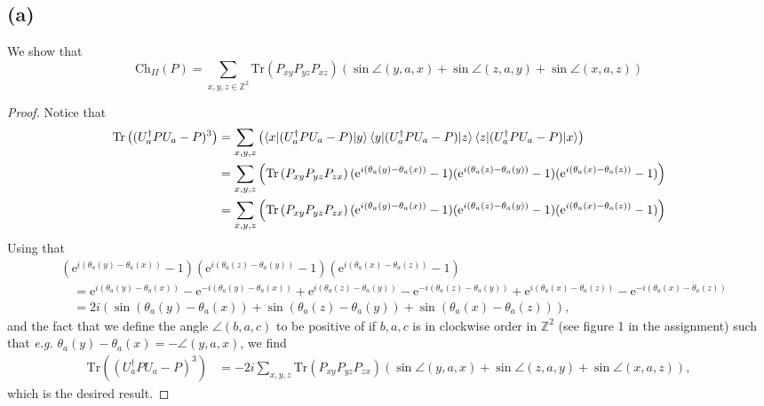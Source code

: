\documentclass[a4paper,11pt]{article}
\newcommand{\euler}[1]{\text{e}^{#1}}
\newcommand{\trace}[1]{\text{Tr}\left(#1\right)}
\newcommand{\eg}{\emph{e.g.} }
\newcommand{\Z}{\mathbb{Z}}
\numberwithin{equation}{section}
\begin{document}
\subsection*{(a)}
We show that \begin{equation}
\text{Ch}_{II}(P)=\sum_{x,y,z\in\Z^2}\trace{P_{xy}P_{yz}P_{xz}}\left(\sin\angle(y,a,x)+\sin\angle(z,a,y)+\sin\angle(x,a,z)\right)
\end{equation}
\begin{proof}
	Notice that \begin{equation}
	\begin{aligned}
	\trace{(U_a^\dagger PU_a-P)^3}&=\sum_{x,y,z}\left(\braket{x|(U_a^\dagger PU_a-P)|y}\braket{y|(U_a^\dagger PU_a-P)|z}\braket{z|(U_a^\dagger PU_a-P)|x}\right)\\
	&=\sum_{x,y,z}\left(\trace{P_{xy}P_{yz}P_{zx}}(\euler{i(\theta_a(y)-\theta_a(x))}-1)(\euler{i(\theta_a(z)-\theta_a(y))}-1)(\euler{i(\theta_a(x)-\theta_a(z))}-1)\right)\\
	&=\sum_{x,y,z}\left(\trace{P_{xy}P_{yz}P_{zx}}(\euler{i(\theta_a(y)-\theta_a(x))}-1)(\euler{i(\theta_a(z)-\theta_a(y))}-1)(\euler{i(\theta_a(x)-\theta_a(z))}-1)\right)
	\end{aligned}
	\end{equation}
	Using that
	\begin{equation}
	\begin{aligned}
	&(\euler{i(\theta_a(y)-\theta_a(x))}-1)(\euler{i(\theta_a(z)-\theta_a(y))}-1)(\euler{i(\theta_a(x)-\theta_a(z))}-1)\\&\quad=\euler{i(\theta_a(y)-\theta_a(x))}-\euler{-i(\theta_a(y)-\theta_a(x))}+\euler{i(\theta_a(z)-\theta_a(y))}-\euler{-i(\theta_a(z)-\theta_a(y))}+\euler{i(\theta_a(x)-\theta_a(z))}-\euler{-i(\theta_a(x)-\theta_a(z))}\\&\quad= 2i\left(\sin(\theta_a(y)-\theta_a(x))+\sin(\theta_a(z)-\theta_a(y))+\sin(\theta_a(x)-\theta_a(z))\right),
	\end{aligned}
	\end{equation}
	and the fact that we define the angle $ \angle(b,a,c) $ to be positive of if $ b,a,c $ is in clockwise order in $ \Z^2 $ (see figure 1 in the assignment) such that \eg $ \theta_a(y)-\theta_a(x)=-\angle(y,a,x) $, we find \begin{equation}
		\begin{aligned}
		\trace{(U_a^\dagger PU_a-P)^3}&=-2i\sum_{x,y,z}\trace{P_{xy}P_{yz}P_{zx}}\left(\sin\angle(y,a,x)+\sin\angle(z,a,y)+\sin\angle(x,a,z)\right),
		\end{aligned}
	\end{equation}
	which is the desired result.
\end{proof}
\end{document}

